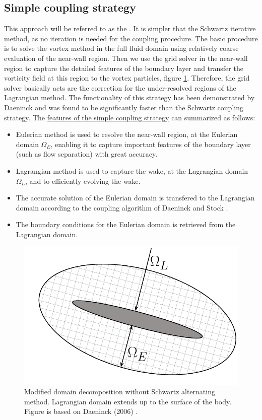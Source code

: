 \subsection{Simple coupling strategy}

This approach will be referred to as the . It is simpler that the Schwartz iterative method, as no iteration is needed for the coupling procedure. The basic procedure is to solve the vortex method in the full fluid domain using relatively coarse evaluation of the near-wall region. Then we use the grid solver in the near-wall region to capture the detailed features of the boundary layer and transfer the vorticity field at this region to the vortex particles, figure \ref{fig:domainDecomposition_daenick}. Therefore, the grid solver basically acts are the correction for the under-resolved regions of the Lagrangian method. The functionality of this strategy has been demonstrated by Daeninck and was found to be significantly faster than the Schwartz coupling strategy. The \underline{features of the simple coupling strategy} can summarized as follows:

	\begin{itemize}
	\item Eulerian method is used to resolve the near-wall region, at the Eulerian domain $\Omega_E$, enabling it to capture important features of the boundary layer (such as flow separation) with great accuracy.
	
	\item Lagrangian method is used to capture the wake, at the Lagrangian domain $\Omega_L$, and to efficiently evolving the wake.
	
	\item The accurate solution of the Eulerian domain is transfered to the Lagrangian domain according to the coupling algorithm of Daeninck \cite{Daeninck2006} and Stock \cite{Stock}.
	
	\item The boundary conditions for the Eulerian domain is retrieved from the Lagrangian domain.
	\end{itemize}

	\begin{figure}[!t]
		\centering
		\includegraphics[width=0.5\linewidth]{figures/introduction/domainDecomposition_daenick.pdf}
		\caption{Modified domain decomposition without Schwartz alternating method. Lagrangian domain extends up to the surface of the body. Figure is based on Daeninck (2006) \cite{Daeninck2006}.}
		\label{fig:domainDecomposition_daenick}
	\end{figure}


